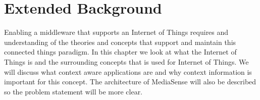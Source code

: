 \chapter{Extended Background}

Enabling a middleware that supports an Internet of Things requires and understanding of the theories and concepts that support and maintain this connected things paradigm. In this chapter we look at what the Internet of Things is and the surrounding concepts that is used for Internet of Things. We will discuss what context aware applications are and why context information is important for this concept. The architecture of MediaSense will also be described so the problem statement will be more clear. 







